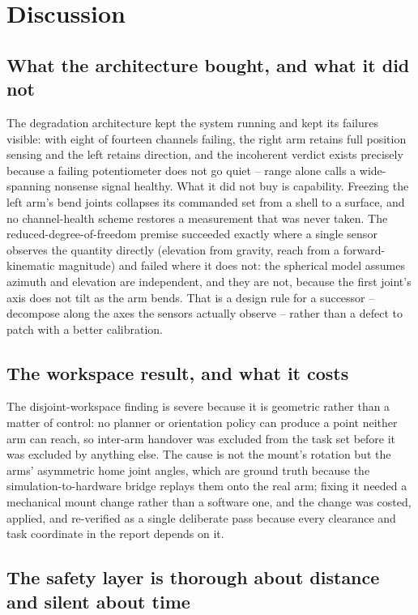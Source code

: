 \chapter{Discussion}
\label{ch:discussionmain}

\section{What the architecture bought, and what it did not}

The degradation architecture kept the system running and kept its failures
visible: with eight of fourteen channels failing, the right arm retains full
position sensing and the left retains direction, and the incoherent verdict
exists precisely because a failing potentiometer does not go quiet -- range
alone calls a wide-spanning nonsense signal healthy. What it did not buy is
capability. Freezing the left arm's bend joints collapses its commanded set
from a shell to a surface, and no channel-health scheme restores a
measurement that was never taken. The reduced-degree-of-freedom premise
succeeded exactly where a single sensor observes the quantity directly
(elevation from gravity, reach from a forward-kinematic magnitude) and failed
where it does not: the spherical model assumes azimuth and elevation are
independent, and they are not, because the first joint's axis does not tilt
as the arm bends. That is a design rule for a successor -- decompose along
the axes the sensors actually observe -- rather than a defect to patch with a
better calibration.

\section{The workspace result, and what it costs}

The disjoint-workspace finding is severe because it is geometric rather than
a matter of control: no planner or orientation policy can produce a point
neither arm can reach, so inter-arm handover was excluded from the task set
before it was excluded by anything else. The cause is not the mount's
rotation but the arms' asymmetric home joint angles, which are ground truth
because the simulation-to-hardware bridge replays them onto the real arm;
fixing it needed a mechanical mount change rather than a software one, and
the change was costed, applied, and re-verified as a single deliberate pass
because every clearance and task coordinate in the report depends on it.

\section{The safety layer is thorough about distance and silent about time}

